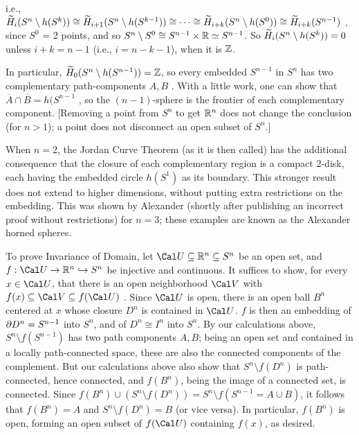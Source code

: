 
i.e., $\widetilde{H}_{i}(S^n\setminus h(S^k)) \cong \widetilde{H}_{i+1}(S^n\setminus h(S^{k-1})) 
\cong \cdots \cong \widetilde{H}_{i+k}(S^n\setminus h(S^0))\cong \widetilde{H}_{i+k}(S^{n-1})$ ,
since $S^0$ = 2 points, and  so $S^n\setminus S^0\cong S^{n-1}\times {\Bbb R} \simeq S^{n-1}$.
So $\widetilde{H}_{i}(S^n\setminus h(S^k)) = 0$ unless $i+k=n-1$ (i.e., $i=n-k-1$), when it is ${\Bbb Z}$.

\ssk

In particular, $\widetilde{H}_0(S^n\setminus h(S^{n-1}))={\Bbb Z}$, so every embedded $S^{n-1}$ in $S^n$
has two complementary path-components $A,B$ . With a little work, one can show that
$\overline{A}\cap \overline{B} = h(S^{n-1}$ , so the $(n-1)$-sphere is the frontier of each
complementary component. [Removing a point from $S^n$ to get ${\Bbb R}^n$ does not change the
conclusion (for $n>1$); a point does not disconnect an open subset of $S^n$.]

\msk

When $n=2$, the Jordan Curve Theorem (as it is then called) has the additional
consequence that the closure of each complementary region is a compact 2-disk,
each having the embedded circle $h(S^1)$ as its boundary. This stronger result
does not extend to higher dimensions, without putting extra restrictions 
on the embedding. This was shown by Alexander (shortly after publishing an
incorrect proof without restrictions) for $n=3$; these examples are known as
the Alexander horned spheres.

\msk

To prove Invariance of Domain, let ${\Cal U}\subseteq \bbr^n\subseteq S^n$ be an open 
set, and $f:{\Cal U}\ra \bbr^n \hookrightarrow S^n$ be injective and continuous. It suffices
to show, for every $x\in {\Cal U}$, that there is an open neighborhood ${\Cal V}$ with
$f(x)\subseteq {\Cal V} \subseteq f({\Cal U})$ . Since ${\Cal U}$ is open,
there is an open ball $B^n$ centered at $x$ whose closure $D^n$ is contained in ${\Cal U}$. 
$f$ is then an embedding of $\partial D^n = S^{n-1}$ into $S^n$, and of $D^n\cong I^n$ into $S^n$.
By our calculations above, $S^n\setminus f(S^{n-1})$ has two path components $A,B$; being an open set 
and contained in a locally path-connected space, these are also the connected components
of the complement. But our calculations above also show that $S^n\setminus f(D^n)$ is
path-connected, hence connected, and $f(B^n)$, being the image of a connected set, is connected.
Since $f(B^n)\cup (S^n\setminus f(D^n)) = S^n\setminus f(S^{n-1} = A\cup B)$, it follows that
$f(B^n)=A$ and $S^n\setminus f(D^n) = B$ (or vice versa). In particular,
$f(B^n)$ is open, forming an open subset of $f({\Cal U})$ containing $f(x)$, as desired.

